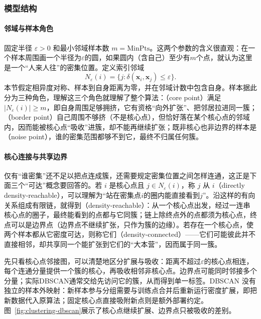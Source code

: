 \subsubsection{模型结构}

\paragraph{邻域与样本角色}

固定半径 $\varepsilon>0$ 和最小邻域样本数 $m=\mathrm{MinPts}$。这两个参数的含义很直观：在一个样本周围画一个半径为$\varepsilon$的圆，如果圆内（含自己）至少有$m$个点，就认为这里是一个“人来人往”的密集位置。定义索引邻域
\[
 N_\varepsilon(i)=
 \{j:\delta(\bm{x}_i,\bm{x}_j)\leq\varepsilon\}.
\]
本节假定相异度对称、样本到自身距离为零，并在邻域计数中包含自身。样本据此分为三种角色，理解这三个角色就理解了整个算法：（core point）满足 $|N_\varepsilon(i)|\geq m$，即自身周围足够拥挤，它有资格“向外扩张”、把邻居拉进同一簇；（border point）自己周围不够挤（不是核心点），但恰好落在某个核心点的邻域内，因而能被核心点“吸收”进簇，却不能再继续扩张；既非核心也非边界的样本是（noise point），谁的密集范围都够不到它，最终不归属任何簇。

\paragraph{核心连接与共享边界}

仅有“谁密集”还不足以把点连成簇，还需要规定密集位置之间怎样连通，这正是下面三个“可达”概念要回答的。若 $i$ 是核心点且 $j\in N_\varepsilon(i)$，称 $j$ 从 $i$（directly density-reachable），可以理解为“站在密集点$i$的圈内能直接看到$j$”。沿这样的有向关系组成有限链，就得到（density-reachable）：从一个核心点出发，经过一连串核心点的圈子，最终能看到的点都与它同簇；链上除终点外的点都须为核心点，终点可以是边界点（边界点不继续扩张，只作为簇的边缘）。若存在一个核心点，使两个样本都从它密度可达，则称它们（density-connected）——它们可能彼此并不直接相邻，却共享同一个能扩张到它们的“大本营”，因而属于同一簇。

先只看核心点邻接图，可以清楚地区分扩展与吸收：距离不超过$\varepsilon$的核心点相连，每个连通分量提供一个簇的核心，再吸收相邻非核心点。边界点可能同时邻接多个分量；实际DBSCAN通常交给先访问它的簇，从而得到单一标签。DBSCAN 没有独立的样本外映射：新样本参与分组需要与训练点合并后重新运行密度扩展，即把新数据代入原算法；固定核心点直接吸附新点则是额外部署约定。图~\ref{fig:clustering-dbscan}展示了核心点继续扩展、边界点只被吸收的差别。

